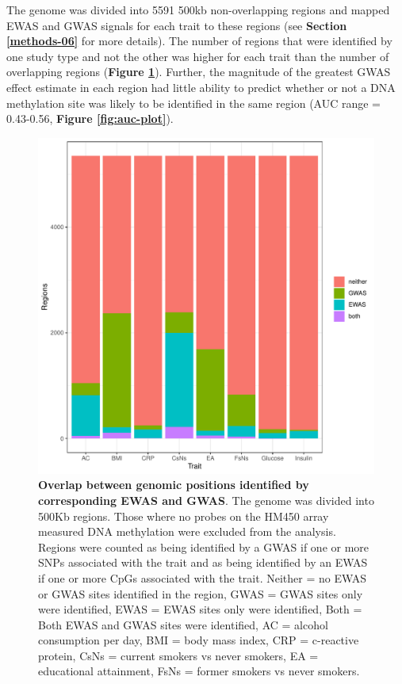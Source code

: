 \documentclass[11pt,twoside]{bristolthesis}
\begin{document}
The genome was divided into 5591 500kb non-overlapping regions and mapped EWAS and GWAS signals for each trait to these regions (see \textbf{Section \ref{methods-06}} for more details). The number of regions that were identified by one study type and not the other was higher for each trait than the number of overlapping regions (\textbf{Figure \ref{fig:overlap-barplot}}). Further, the magnitude of the greatest GWAS effect estimate in each region had little ability to predict whether or not a DNA methylation site was likely to be identified in the same region (AUC range = 0.43-0.56, \textbf{Figure \ref{fig:auc-plot}}).




\begin{figure}

{\centering \includegraphics[width=1\linewidth]{figure/06-ewas_gwas_comparison/all_traits_overlap_bar} 

}

\caption[Overlap between genomic positions identified by corresponding EWAS and GWAS]{\textbf{Overlap between genomic positions identified by corresponding EWAS and GWAS}. The genome was divided into 500Kb regions. Those where no probes on the HM450 array measured DNA methylation were excluded from the analysis. Regions were counted as being identified by a GWAS if one or more SNPs associated with the trait and as being identified by an EWAS if one or more CpGs associated with the trait. Neither = no EWAS or GWAS sites identified in the region, GWAS = GWAS sites only were identified, EWAS = EWAS sites only were identified, Both = Both EWAS and GWAS sites were identified, AC = alcohol consumption per day, BMI = body mass index, CRP = c-reactive protein, CsNs = current smokers vs never smokers, EA = educational attainment, FsNs = former smokers vs never smokers.}\label{fig:overlap-barplot}
\end{figure}
\end{document}
